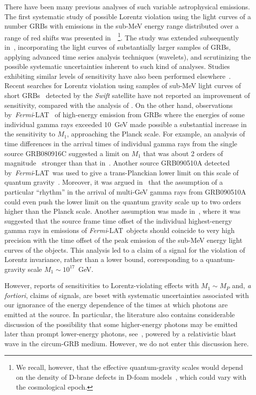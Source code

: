 \documentclass[12pt]{article}
\newcommand{\lat}{{\it Fermi}-LAT}
\begin{document}
There have been many previous analyses of such variable astrophysical emissions.
The first systematic study of possible Lorentz violation using
the light curves of a number GRBs with emissions in the sub-MeV energy range distributed over
a range of red shifts was presented in~\cite{mitsou}~\footnote{We recall, however,
that the effective quantum-gravity scales would depend on the density of D-brane defects
in D-foam models~\cite{emnewuncert}, which could vary with the cosmological epoch.}.
The study was extended subsequently in~\cite{EMNS,EMNSS},
incorporating the light curves of substantially larger samples of GRBs,
applying advanced time series analysis techniques (wavelets), and scrutinizing
the possible systematic uncertainties inherent to such kind of analyses.  Studies
exhibiting similar levels of sensitivity have also been performed elsewhere~\cite{Lamon,Bolmont}.
Recent searches for Lorentz violation using samples
of sub-MeV light curves of short GRBs~\cite{SWIFT_SHORT_LV}
detected by the {\it Swift} satellite have not reported an improvement of sensitivity, compared
with the analysis of \cite{EMNSS}.  On the other hand, observations by~\lat~\cite{Fermi-LAT} of high-energy emission from GRBs where
the energies of some individual gamma rays exceeded 10~GeV made possible
a substantial increase in the sensitivity to $M_1$, approaching the Planck scale.
For example, an analysis of time differences in the arrival times of individual gamma rays from
the single source GRB080916C suggested a limit on $M_1$ that was
about 2 orders of magnitude~\cite{Fermi_080916} stronger than that in~\cite{EMNSS}.
Another source GRB090510A detected by~\lat~was used to give
a {trans-Planckian} lower limit on this scale of quantum gravity~\cite{Fermi_090510,NonFermi_090510,NonFermi_090510_develop}.
Moreover, it was argued in~\cite{Nemiroff} that the assumption of a particular ``rhythm'' in the arrival of multi-GeV gamma rays from
GRB090510A could even push the lower limit on the quantum gravity scale
up to two orders higher than the Planck scale. Another assumption was made in~\cite{ch1,ch2,ch3,ch4}, where it was suggested that the source frame
time offset of the individual highest-energy gamma rays in emissions of \lat~objects should coincide to
very high precision with the time offset of the peak emission of the sub-MeV energy light curves of  the objects. This
analysis led to a claim of a signal for the violation of Lorentz invariance, rather than a lower bound,
corresponding to a quantum-gravity scale $M_1 \sim10^{17}$~GeV.

However, reports of sensitivities to Lorentz-violating effects with $M_1 \sim M_P$ and, {\it a fortiori}, claims of signals, are beset
with systematic uncertainties associated with our ignorance of the energy dependence of the times at which
photons are emitted at the source. In particular, the literature also contains considerable
discussion of the possibility that some higher-energy photons may be emitted later than prompt lower-energy photons, see~\cite{HE_GRB}, powered
by a relativistic blast wave in the circum-GRB medium. However, we do not enter this discussion here.
\end{document}
